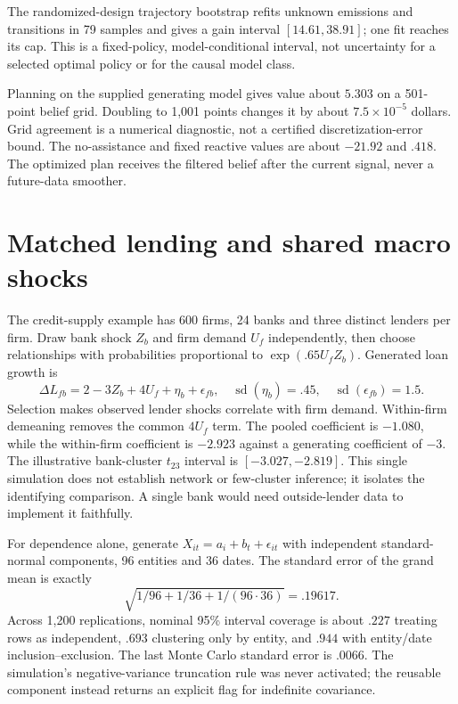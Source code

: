 The randomized-design trajectory bootstrap refits unknown emissions
and transitions in 79 samples and gives a gain interval
$[14.61,38.91]$; one fit reaches its cap. This is a fixed-policy,
model-conditional interval, not uncertainty for a selected optimal
policy or for the causal model class.

Planning on the supplied generating model gives value about $5.303$
on a 501-point belief grid. Doubling to 1,001 points changes it by
about $7.5\times10^{-5}$ dollars. Grid agreement is a numerical
diagnostic, not a certified discretization-error bound. The no-assistance
and fixed reactive values are about $-21.92$ and $.418$.
The optimized plan receives the filtered belief after the current
signal, never a future-data smoother.

\section{Matched lending and shared macro shocks}
\label{r3:credit-dependence-study}

The credit-supply example has 600 firms, 24 banks and three distinct
lenders per firm. Draw bank shock $Z_b$ and firm demand $U_f$
independently, then choose relationships with probabilities proportional
to $\exp(.65U_fZ_b)$. Generated loan growth is
\[
 \Delta L_{fb}=2-3Z_b+4U_f+\eta_b+\epsilon_{fb},
 \quad \operatorname{sd}(\eta_b)=.45,\quad
 \operatorname{sd}(\epsilon_{fb})=1.5.
\]
Selection makes observed lender shocks correlate with firm demand.
Within-firm demeaning removes the common $4U_f$ term. The pooled
coefficient is $-1.080$, while the within-firm coefficient is $-2.923$
against a generating coefficient of $-3$. The illustrative bank-cluster
$t_{23}$ interval is $[-3.027,-2.819]$. This single simulation does
not establish network or few-cluster inference; it isolates the
identifying comparison. A single bank would need outside-lender data
to implement it faithfully.

For dependence alone, generate
$X_{it}=a_i+b_t+\epsilon_{it}$ with independent standard-normal
components, 96 entities and 36 dates. The standard error of the
grand mean is exactly
\[
 \sqrt{1/96+1/36+1/(96\cdot36)}=.19617.
\]
Across 1,200 replications, nominal 95\% interval coverage is about
$.227$ treating rows as independent, $.693$ clustering only by entity,
and $.944$ with entity/date inclusion--exclusion. The last Monte Carlo
standard error is $.0066$. The simulation's negative-variance
truncation rule was never activated; the reusable component instead
returns an explicit flag for indefinite covariance.

